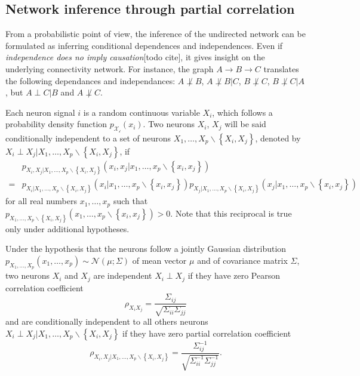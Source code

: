 \documentclass[wcp]{jmlr}
\begin{document}
\subsection{Network inference through partial correlation}
\label{sec:inference}

From a probabilistic point of view, the inference of the undirected network
can be formulated as inferring conditional dependences and
independences.  Even if \textit{independence
does no imply causation}[todo cite], it gives insight on the underlying connectivity
network. For instance, the graph $A \rightarrow B \rightarrow C$ translates the
following dependances and independances: $A \not\perp B$, $A \not\perp B | C$,
$B \not\perp C$, $B \not\perp C | A$, but $A \perp C | B$ and  $A \not\perp C$.

Each neuron signal $i$ is a random continuous variable $X_i$,
which follows a probability density function $p_\mathcal{X_i}(x_i)$.
Two neurons $X_i$, $X_j$ will be said conditionally independent
to a set of neurons $X_1,\ldots,X_p \backslash \left\{X_i, X_j\right\}$, denoted
by  $X_i \perp X_j | X_1,\ldots,X_p \backslash \left\{X_i, X_j\right\}$,  if
\begin{align*}
&p_{X_i, X_j | X_1,\ldots,X_p \backslash \left\{X_i, X_j\right\}}
    (x_i, x_j | x_1,\ldots,x_p \backslash \left\{x_i, x_j\right\}) \\
=&p_{X_i | X_1,\ldots,X_p \backslash \left\{X_i, X_j\right\}}
    (x_i | x_1,\ldots,x_p \backslash \left\{x_i, x_j\right\})
p_{X_j | X_1,\ldots,X_p \backslash \left\{X_i, X_j\right\}}
    (x_j | x_1,\ldots,x_p \backslash \left\{x_i, x_j\right\})
\end{align*}
for all real numbers $x_1,\ldots,x_p $ such that
$p_{X_1,\ldots,X_p \backslash \left\{X_i, X_j\right\}}
(x_1,\ldots,x_p \backslash \left\{x_i, x_j\right\}) > 0$. Note that this
reciprocal is true only under additional hypotheses.

Under the hypothesis that the neurons follow a jointly Gaussian distribution
$p_{X_1,\ldots,X_p}(x_1,\ldots,x_p) \sim \mathcal{N}(\mu; \Sigma)$
of mean vector $\mu$ and of covariance matrix $\Sigma$, two neurons $X_i$
and $X_j$ are independent $X_i \perp X_j$ if they have zero Pearson correlation
coefficient
\[
\rho_{X_iX_j} = \frac{\Sigma_{ij}}{\sqrt{\Sigma_{ii} \Sigma_{jj}}}
\]
and are conditionally independent to all others neurons
$X_i \perp X_j | X_1,\ldots,X_p \backslash \left\{X_i, X_j\right\}$ if they
have zero partial correlation coefficient
\[
\rho_{X_i, X_j | X_1,\ldots,X_p \backslash \left\{X_i, X_j\right\}} =
\frac{\Sigma^{-1}_{ij}}{\sqrt{\Sigma^{-1}_{ii} \Sigma^{-1}_{jj}}}.
\]
\end{document}
